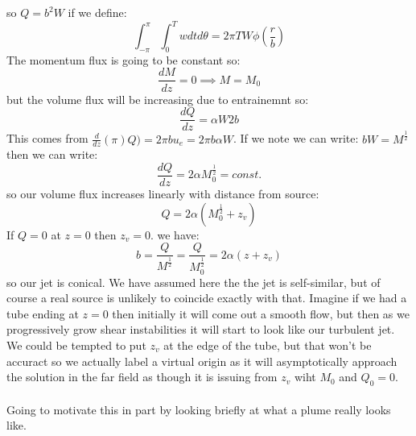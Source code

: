 \documentclass{article}
\begin{document}
so $Q = b^2 W$ if we define:
$$
 \int_{-\pi}^{\pi} \int_0^T w d t d\theta = 2 \pi T W \phi(\frac{r}{b})
$$
The momentum flux is going to be constant so:
$$
 \frac{dM}{dz} = 0 \implies M = M_0
$$
but the volume flux will be increasing due to entrainemnt so:
$$
 \frac{dQ}{dz} = \alpha W 2 b
$$
This comes from $\frac{d}{dz}(\pi) Q ) = 2 \pi b u_e = 2 \pi b \alpha W$. If we note we can write:
$bW = M^{\frac{1}{2}}$ then we can write:
$$
 \frac{dQ}{dz} = 2 \alpha M_0^{\frac{1}{2}} = const.
$$
so our volume flux increases linearly with distance from source:
$$
Q = 2 \alpha (M_0^{\frac{1}{2}} + z_v)
$$
If $Q=0$ at $z=0$ then $z_v = 0$. we have:
$$
 b= \frac{Q}{M^{\frac{1}{2}}} = \frac{Q}{M_0^{\frac{1}{2}}} = 2 \alpha ( z + z_v)
$$
so our jet is conical. We have assumed here the the jet is self-similar, but of course a real source is unlikely to coincide exactly with that. Imagine if we had a tube ending at $z=0$ then initially it will come out a smooth flow, but then as we progressively grow shear instabilities it will start to look like our turbulent jet. We could be tempted to put $z_v$ at the edge of the tube, but that won't be accuract so we actually label a virtual origin as it will asymptotically approach the solution in the far field as though it is issuing from $z_v$ wiht $M_0$ and $Q_0 = 0$.\\\\
Going to motivate this in part by looking briefly at what a plume really looks like.
\end{document}
